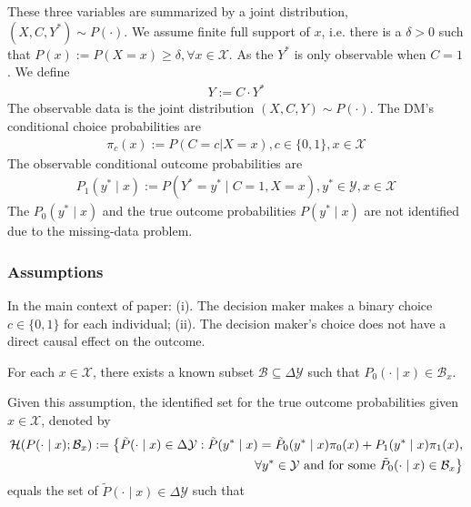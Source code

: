 \documentclass[11pt]{elegantbook}
\begin{document}
These three variables are summarized by a joint distribution, $(X,C,Y^*)\sim P(\cdot)$. We assume finite full support of $x$, i.e. there is a $\delta>0$ such that $P(x):=P(X=x)\geq \delta,\forall x\in \mathcal{X}$. As the $Y^*$ is only observable when $C=1$. We define
\begin{equation}
    \begin{aligned}
        Y:=C\cdot Y^*
    \end{aligned}
    \nonumber
\end{equation}
The observable data is the joint distribution $(X,C,Y)\sim P(\cdot)$. The DM's conditional choice probabilities are
\begin{equation}
    \begin{aligned}
        \pi_c(x):=P(C=c|X=x),c\in\{0,1\},x\in \mathcal{X}
    \end{aligned}
    \nonumber
\end{equation}
The observable conditional outcome probabilities are
\begin{equation}
    \begin{aligned}
        P_1(y^*\mid x):=P(Y^*=y^*\mid C=1, X=x),y^*\in \mathcal{Y},x\in \mathcal{X}
    \end{aligned}
    \nonumber
\end{equation}
The $P_0(y^*\mid x)$ and the true outcome probabilities $P(y^*\mid x)$ are not identified due to the missing-data problem.

\subsubsection*{Assumptions}
\begin{note}
    In the main context of paper: (i). The decision maker makes a binary choice $c\in\{0,1\}$ for each individual; (ii). The decision maker's choice does not have a direct causal effect on the outcome.
\end{note}

\begin{assumption}
    For each $x\in \mathcal{X}$, there exists a known subset $\mathcal{B}\subseteq \Delta \mathcal{Y}$ such that $P_0(\cdot\mid x)\in \mathcal{B}_x$.
\end{assumption}
Given this assumption, the identified set for the true outcome probabilities given $x\in \mathcal{X}$, denoted by
\begin{equation}
    \begin{aligned}
        \mathcal{H}(P(\cdot\mid x);\mathcal{B}_x):=\big\{\tilde{P}(\cdot\mid x)\in\Delta \mathcal{Y}: \tilde{P}(y^*\mid x)=\tilde{P}_0(y^*\mid x)\pi_0(x)+P_1(y^*\mid x)\pi_1(x),\\\forall y^*\in \mathcal{Y} \textnormal{ and for some } \tilde{P}_0(\cdot\mid x)\in \mathcal{B}_x\big\}
    \end{aligned}
    \nonumber
\end{equation}
equals the set of $\tilde{P}(\cdot\mid x)\in\Delta \mathcal{Y}$ such that 





\appendix











\end{document}
